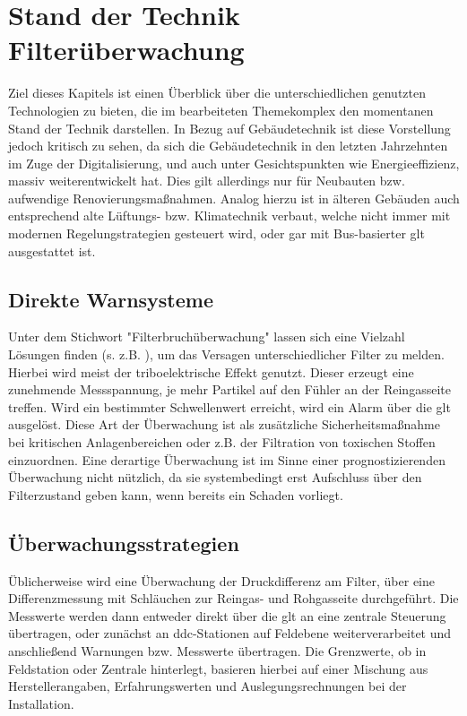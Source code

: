 \chapter{Stand der Technik Filterüberwachung}
\label{ch:stand}
    Ziel dieses Kapitels ist einen Überblick über die unterschiedlichen genutzten Technologien zu bieten, die im bearbeiteten Themekomplex den momentanen Stand der Technik darstellen. In Bezug auf Gebäudetechnik ist diese Vorstellung jedoch kritisch zu sehen, da sich die Gebäudetechnik in den letzten Jahrzehnten im Zuge der Digitalisierung, und auch unter Gesichtspunkten wie Energieeffizienz, massiv weiterentwickelt hat. Dies gilt allerdings nur für Neubauten bzw. aufwendige Renovierungsmaßnahmen. Analog hierzu ist in älteren Gebäuden auch entsprechend alte Lüftungs- bzw. Klimatechnik verbaut, welche nicht immer mit modernen Regelungstrategien gesteuert wird, oder gar mit Bus-basierter \ac{glt} ausgestattet ist.
    \section{Direkte Warnsysteme}
    Unter dem Stichwort "Filterbruchüberwachung" lassen sich eine Vielzahl Lösungen finden (s. z.B. \cite{fbu}), um das Versagen unterschiedlicher Filter zu melden. Hierbei wird meist der triboelektrische Effekt genutzt.
    Dieser erzeugt eine zunehmende Messspannung, je mehr Partikel auf den Fühler an der Reingasseite treffen. Wird ein bestimmter Schwellenwert erreicht, wird ein Alarm über die \ac{glt} ausgelöst.
    Diese Art der Überwachung ist als zusätzliche Sicherheitsmaßnahme bei kritischen Anlagenbereichen oder z.B. der Filtration von toxischen Stoffen einzuordnen.
    Eine derartige Überwachung ist im Sinne einer prognostizierenden Überwachung nicht nützlich, da sie systembedingt erst Aufschluss über den Filterzustand geben kann, wenn bereits ein Schaden vorliegt.
    \section{Überwachungsstrategien}
    Üblicherweise wird eine Überwachung der Druckdifferenz am Filter, über eine Differenzmessung mit Schläuchen zur Reingas- und Rohgasseite durchgeführt. Die Messwerte werden dann entweder direkt über die \ac{glt} an eine zentrale Steuerung übertragen, oder zunächst an \ac{ddc}-Stationen auf Feldebene weiterverarbeitet und anschließend Warnungen bzw. Messwerte übertragen. Die Grenzwerte, ob in Feldstation oder Zentrale hinterlegt, basieren hierbei auf einer Mischung aus Herstellerangaben, Erfahrungswerten und Auslegungsrechnungen bei der Installation. 
